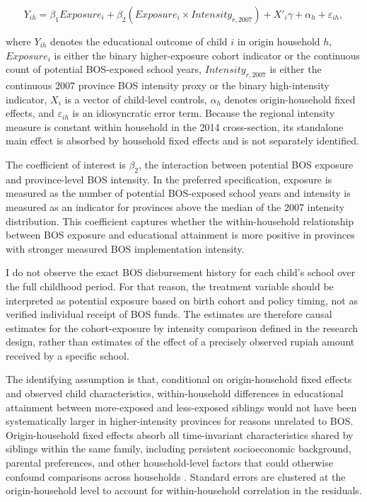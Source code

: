 \documentclass[a4paper, 12pt]{article}
\begin{document}
\begin{doublespacing}
\begin{equation}
    Y_{ih} = \beta_{1} Exposure_{i} + \beta_{2} \left(Exposure_i \times Intensity_{r, 2007}\right) + X'_{i}\gamma + \alpha_h  + \varepsilon_{ih},
\end{equation}

where $Y_{ih}$ denotes the educational outcome of child $i$ in origin household $h$, $Exposure_{i}$ is either the binary higher-exposure cohort indicator or the continuous count of potential BOS-exposed school years, $Intensity_{r, 2007}$ is either the continuous 2007 province BOS intensity proxy or the binary high-intensity indicator, $X_{i}$ is a vector of child-level controls, $\alpha_{h}$ denotes origin-household fixed effects, and $\varepsilon_{ih}$ is an idiosyncratic error term. Because the regional intensity measure is constant within household in the 2014 cross-section, its standalone main effect is absorbed by household fixed effects and is not separately identified.

The coefficient of interest is $\beta_{2}$, the interaction between potential BOS exposure and province-level BOS intensity. In the preferred specification, exposure is measured as the number of potential BOS-exposed school years and intensity is measured as an indicator for provinces above the median of the 2007 intensity distribution. This coefficient captures whether the within-household relationship between BOS exposure and educational attainment is more positive in provinces with stronger measured BOS implementation intensity.

I do not observe the exact BOS disbursement history for each child's school over the full childhood period. For that reason, the treatment variable should be interpreted as potential exposure based on birth cohort and policy timing, not as verified individual receipt of BOS funds. The estimates are therefore causal estimates for the cohort-exposure by intensity comparison defined in the research design, rather than estimates of the effect of a precisely observed rupiah amount received by a specific school.

The identifying assumption is that, conditional on origin-household fixed effects and observed child characteristics, within-household differences in educational attainment between more-exposed and less-exposed siblings would not have been systematically larger in higher-intensity provinces for reasons unrelated to BOS. Origin-household fixed effects absorb all time-invariant characteristics shared by siblings within the same family, including persistent socioeconomic background, parental preferences, and other household-level factors that could otherwise confound comparisons across households \citep{AngristPischke2009}. Standard errors are clustered at the origin-household level to account for within-household correlation in the residuals.


\end{doublespacing}
\end{document}
